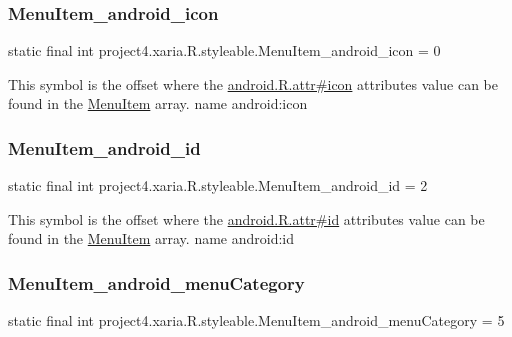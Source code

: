 \subsubsection{\texorpdfstring{Menu\+Item\+\_\+android\+\_\+icon}{MenuItem\_android\_icon}}
{\footnotesize\ttfamily static final int project4.\+xaria.\+R.\+styleable.\+Menu\+Item\+\_\+android\+\_\+icon = 0\hspace{0.3cm}{\ttfamily [static]}}

This symbol is the offset where the \hyperlink{}{android.\+R.\+attr\#icon} attribute\textquotesingle{}s value can be found in the \hyperlink{classproject4_1_1xaria_1_1R_1_1styleable_a8a573827fcaba6497e560662224b5530}{Menu\+Item} array.  name android\+:icon \mbox{\label{classproject4_1_1xaria_1_1R_1_1styleable_ab6868d10b29e450bcfb02c2f597a71b6}} 
\subsubsection{\texorpdfstring{Menu\+Item\+\_\+android\+\_\+id}{MenuItem\_android\_id}}
{\footnotesize\ttfamily static final int project4.\+xaria.\+R.\+styleable.\+Menu\+Item\+\_\+android\+\_\+id = 2\hspace{0.3cm}{\ttfamily [static]}}

This symbol is the offset where the \hyperlink{}{android.\+R.\+attr\#id} attribute\textquotesingle{}s value can be found in the \hyperlink{classproject4_1_1xaria_1_1R_1_1styleable_a8a573827fcaba6497e560662224b5530}{Menu\+Item} array.  name android\+:id \mbox{\label{classproject4_1_1xaria_1_1R_1_1styleable_af46cfe726f92832e0764981044beda57}} 
\subsubsection{\texorpdfstring{Menu\+Item\+\_\+android\+\_\+menu\+Category}{MenuItem\_android\_menuCategory}}
{\footnotesize\ttfamily static final int project4.\+xaria.\+R.\+styleable.\+Menu\+Item\+\_\+android\+\_\+menu\+Category = 5\hspace{0.3cm}{\ttfamily [static]}}

